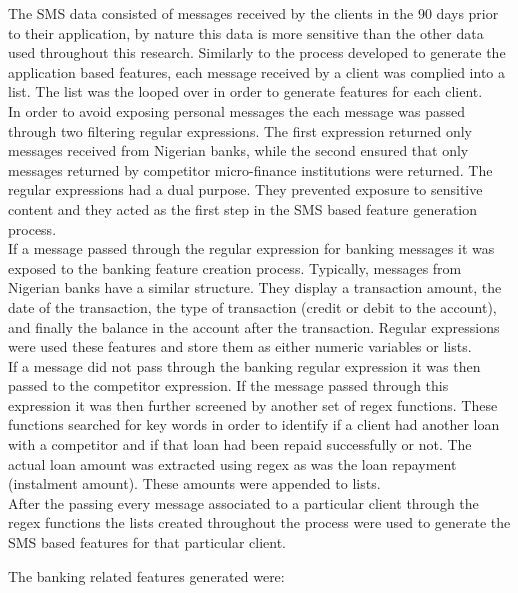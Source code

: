 The SMS data consisted of messages received by the clients in the 90 days prior to their application, by nature this data is more sensitive than the other data used throughout this research. Similarly to the process developed to generate the application based features, each message received by a client was complied into a list. The list was the looped over in order to generate features for each client. \\

In order to avoid exposing personal messages the each message was passed through two filtering regular expressions. The first expression returned only messages received from Nigerian banks, while the second ensured that only messages returned by competitor micro-finance institutions were returned. The regular expressions had a dual purpose. They prevented exposure to sensitive content and they acted as the first step in the SMS based feature generation process. \\

If a message passed through the regular expression for banking messages it was exposed to the banking feature creation process. Typically, messages from Nigerian banks have a similar structure. They display a transaction amount, the date of the transaction, the type of transaction (credit or debit to the account), and finally the balance in the account after the transaction. Regular expressions were used these features and store them as either numeric variables or lists.  \\

If a message did not pass through the banking regular expression it was then passed to the competitor expression. If the message passed through this expression it was then further screened by another set of regex functions. These functions searched for key words in order to identify if a client had another loan with a competitor and if that loan had been repaid successfully or not. The actual loan amount was extracted using regex as was the loan repayment (instalment amount). These amounts were appended to lists. \\

After the passing every message associated to a particular client through the regex functions the lists created throughout the process were used to generate the SMS based features for that particular client. \\

\vspace{10pt}

The banking related features generated were:

